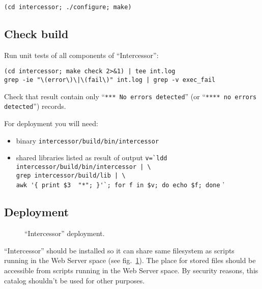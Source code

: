 \documentclass[a4paper,twoside]{article}
\newcommand{\Inter}{{\fontseries{b}\selectfont ``Intercessor''}}
\begin{document}
\begin{verbatim}
(cd intercessor; ./configure; make)
\end{verbatim}

\subsection{Check build\label{DeplCheck}}

Run unit tests of all components of \Inter{}:
\begin{verbatim}
(cd intercessor; make check 2>&1) | tee int.log
grep -ie "\(error\)\|\(fail\)" int.log | grep -v exec_fail
\end{verbatim}
Check that result contain only ``\verb|*** No errors detected|'' (or ``\verb|**** no errors detected|'') records.

For deployment you will need:
\begin{itemize}
  \item binary \verb|intercessor/build/bin/intercessor|
  \item shared libraries listed as result of output
        \verb+v=`ldd intercessor/build/bin/intercessor | \+ \\
        \verb+grep intercessor/build/lib | \+ \\ 
        \verb+awk '{ print $3  "*"; }'`; for f in $v; do echo $f; done+ ' %
\end{itemize}

\subsection{Deployment}

\begin{figure}
\begin{center}
%  
\end{center}
\caption{\Inter{} deployment.\label{IntercessorDeplDiagram}}
\end{figure}

\Inter{} should be installed so it can share same filesystem as scripts
running in the Web Server space (see fig.~\ref{IntercessorDeplDiagram}). The place for stored files should
be accessible from scripts running in the Web Server space. By security
reasons, this catalog shouldn't be used for other purposes.
\end{document}
